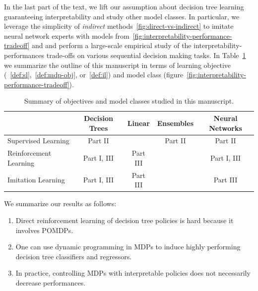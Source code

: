 In the last part of the text, we lift our assumption about decision tree learning guaranteeing interpretability and study other model classes.
In particular, we leverage the simplicity of \textit{indirect} methods~\ref{fig:direct-vs-indirect} to imitate neural network experts with models from~\ref{fig:interpretability-performance-tradeoff} and and perform a large-scale empirical study of the interpretability-performances trade-offs on various sequential decision making tasks.
In Table~\ref{tab:summary-parts} we summarize the outline of this manuscript in terms of learning objective (~\ref{def:sl},~\ref{def:mdp-obj}, or~\ref{def:il}) and model class (figure~\ref{fig:interpretability-performance-tradeoff}).

\begin{table}[htbp]
    \centering
    \begin{tabular}{|l|c|c|c|c|}
        \hline
         & \textbf{Decision Trees} & \textbf{Linear} & \textbf{Ensembles} & \textbf{Neural Networks} \\
        \hline
        Supervised Learning & Part II &  & Part II & Part II\\
        \hline
        Reinforcement Learning & Part I, III & Part III & & Part I, III \\
        \hline
        Imitation Learning & Part I, III & Part III & & Part III \\
        \hline
    \end{tabular}
    \caption{Summary of objectives and model classes studied in this manuscript.}
    \label{tab:summary-parts}
\end{table}

We summarize our results as follows:

\begin{enumerate}
    \item Direct reinforcement learning of decision tree policies is hard because it involves POMDPs.
    \item One can use dynamic programming in MDPs to induce highly performing decision tree classifiers and regressors.
    \item In practice, controlling MDPs with interpretable policies does not necessarily decrease performances.
\end{enumerate}

        
